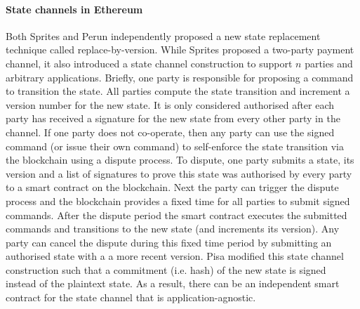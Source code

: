 \documentclass{llncs}
\begin{document}
\paragraph{State channels in Ethereum} 

Both Sprites and Perun independently proposed a new state replacement technique called replace-by-version. 
While Sprites proposed a two-party payment channel, it also introduced a state channel construction to support $n$ parties and arbitrary applications. 
Briefly, one party is responsible for proposing a command to transition the state.
All parties compute the state transition and increment a version number for the new state. 
It is only considered authorised after each party has received a signature for the new state from every other party in the channel. 
If one party does not co-operate, then any party can use the signed command (or issue their own command) to self-enforce the state transition via the blockchain using a dispute process. 
To dispute, one party submits a state, its version and a list of signatures to prove this state was authorised by every party to a smart contract on the blockchain. 
Next the party can trigger the dispute process and the blockchain provides a fixed time for all parties to submit signed commands. 
After the dispute period the smart contract executes the submitted commands and transitions to the new state (and increments its version).  
Any party can cancel the dispute during this fixed time period by submitting an authorised state with a a more recent version. 
Pisa modified this state channel construction such that a commitment (i.e. hash) of the new state is signed instead of the plaintext state. 
As a result, there can be an independent smart contract for the state channel that is application-agnostic. 
\end{document}
